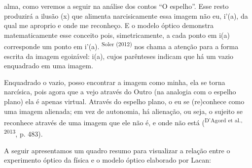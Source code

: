 \begin{multicols}{2}
alma,\allowbreak{} como veremos a seguir na análise dos contos “O espelho”.\allowbreak{} Esse resto produzirá a ilusão (\allowbreak{}x)\allowbreak{} que alimenta narcisicamente essa imagem não eu,\allowbreak{} i’(\allowbreak{}a)\allowbreak{},\allowbreak{} da qual me aproprio e onde me reconheço.\allowbreak{} E o modelo óptico demonstra matematicamente esse conceito pois,\allowbreak{} simetricamente,\allowbreak{} a cada ponto em i(\allowbreak{}a)\allowbreak{} corresponde um ponto em i’(\allowbreak{}a)\allowbreak{}.\allowbreak{} \textsuperscript{Soler (\allowbreak{}2012)\allowbreak{}} nos chama a atenção para a forma escrita da imagem egoizável:\allowbreak{} i(\allowbreak{}a)\allowbreak{},\allowbreak{} cujos parênteses indicam que há um vazio enquadrado em uma imagem.\allowbreak{}\par{}Enquadrado o vazio,\allowbreak{} posso encontrar a imagem como minha,\allowbreak{} ela se torna narcísica,\allowbreak{} pois agora que a vejo através do Outro (\allowbreak{}na analogia com o espelho plano)\allowbreak{} ela é apenas virtual.\allowbreak{} Através do espelho plano,\allowbreak{} o eu se (\allowbreak{}re)\allowbreak{}conhece como uma imagem alienada; em vez de autonomia,\allowbreak{} há alienação,\allowbreak{} ou seja,\allowbreak{} o sujeito se reconhece através de uma imagem que ele não é,\allowbreak{} e onde não está (\allowbreak{}\textsuperscript{D’Agord et al.\allowbreak{},\allowbreak{} 2013},\allowbreak{} p.\allowbreak{} 483)\allowbreak{}.\allowbreak{}\par{}A seguir apresentamos um quadro resumo para visualizar a relação entre o experimento óptico da física e o modelo óptico elaborado por Lacan:\allowbreak{}\par{}\end{multicols}
{}
